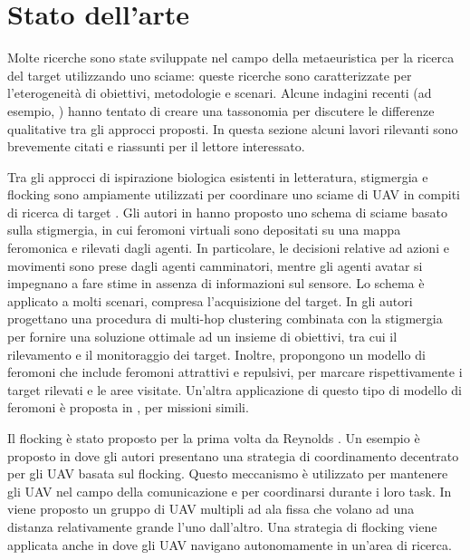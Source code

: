 \chapter{Stato dell'arte}

Molte ricerche sono state sviluppate nel campo della metaeuristica per la ricerca del target utilizzando uno sciame: queste ricerche sono caratterizzate per l'eterogeneità di obiettivi, metodologie e scenari. 
Alcune indagini recenti (ad esempio, \cite{senanayake2016search}) hanno tentato di creare una tassonomia per discutere le differenze qualitative tra gli approcci proposti. 
In questa sezione alcuni lavori rilevanti sono brevemente citati e riassunti per il lettore interessato.

Tra gli approcci di ispirazione biologica esistenti in letteratura, stigmergia e flocking sono ampiamente utilizzati per coordinare uno sciame di UAV in compiti di ricerca di target \cite{parunak2002digital}. 
Gli autori in \cite{sauter2005performance} hanno proposto uno schema di sciame basato sulla stigmergia, in cui feromoni virtuali sono depositati su una mappa feromonica e rilevati dagli agenti. 
In particolare, le decisioni relative ad azioni e movimenti sono prese dagli agenti camminatori, mentre gli agenti avatar si impegnano a fare stime in assenza di informazioni sul sensore. 
Lo schema è applicato a molti scenari, compresa l'acquisizione del target. 
In \cite{brust2017target} gli autori progettano una procedura di multi-hop clustering combinata con la stigmergia per fornire una soluzione ottimale ad un insieme di obiettivi, tra cui il rilevamento e il monitoraggio dei target. 
Inoltre, propongono un modello di feromoni che include feromoni attrattivi e repulsivi, per marcare rispettivamente i target rilevati e le aree visitate. 
Un'altra applicazione di questo tipo di modello di feromoni è proposta in \cite{atten2016uav}, per missioni simili.

Il flocking è stato proposto per la prima volta da Reynolds \cite{reynolds1987flocks}. 
Un esempio è proposto in \cite{vasarhelyi2014outdoor} dove gli autori presentano una strategia di coordinamento decentrato per gli UAV basata sul flocking. 
Questo meccanismo è utilizzato per mantenere gli UAV nel campo della comunicazione e per coordinarsi durante i loro task. 
In \cite{hauert2011reynolds} viene proposto un gruppo di UAV multipli ad ala fissa che volano ad una distanza relativamente grande l'uno dall'altro. 
Una strategia di flocking viene applicata anche in \cite{quintero2013flocking} dove gli UAV navigano autonomamente in un'area di ricerca.

